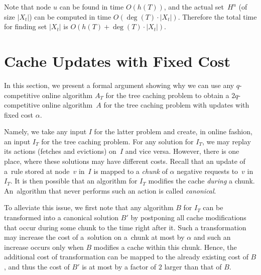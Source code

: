 Note that node $u$ can be found in time $O(h(T))$, and the 
actual set~$H^u$ (of size $|X_t|$) can be computed 
in time $O(\deg(T) \cdot |X_t|)$. Therefore the total time 
for finding set $|X_t|$ is $O(h(T) + \deg(T) \cdot |X_t|)$.


%



\section{Cache Updates with Fixed Cost}
\label{sec:bisimulation}


In this section, we present a formal argument showing why we can use any
$q$-competitive online algorithm $A_T$ for the tree caching problem to obtain
a $2 q$-competitive online algorithm~$A$ for the tree caching problem with updates with fixed cost $\alpha$.

Namely, we take any input $I$ for the latter problem and create, in online
fashion, an input $I_T$ for the tree caching problem.
For any solution for $I_T$, we may replay its actions (fetches and evictions)
on~$I$ and vice versa. However, there is one place, where these solutions 
may have different costs. Recall that an update of a~rule stored at node~$v$
in~$I$ is mapped to a \emph{chunk} of $\alpha$ negative requests to~$v$ 
in~$I_T$. It is then possible that an algorithm for $I_T$ modifies the cache
\emph{during} a chunk. An~algorithm that never performs such an action
is called \emph{canonical}.

To alleviate this issue, we first note that any algorithm $B$ for $I_T$ can be
transformed into a canonical solution $B'$ by postponing all cache modifications
that occur during some chunk to the time right after it. Such a transformation
may increase the cost of a~solution on a~chunk at most by $\alpha$ and such an
increase occurs only when $B$ modifies a cache within this chunk. Hence, the
additional cost of transformation can be mapped to the already existing cost of
$B$, and thus the cost of $B'$ is at most by a factor of $2$ larger than that
of $B$.

